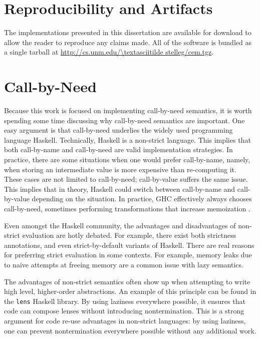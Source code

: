 \section{Reproducibility and Artifacts}

The implementations presented in this dissertation are available for download to
allow the reader to reproduce any claims made. All of the software is bundled as
a single tarball at \url{http://cs.unm.edu/\textasciitilde stelleg/cem.tgz}. 

\section{Call-by-Need}

Because this work is focused on implementing call-by-need semantics, it is worth
spending some time discussing why call-by-need semantics are important. One easy
argument is that call-by-need underlies the widely used programming language
Haskell. Technically, Haskell is a non-strict language. This implies that both
call-by-name and call-by-need are valid implementation strategies. In practice,
there are some situations when one would prefer call-by-name, namely, when
storing an intermediate value is more expensive than re-computing it. These
cases are not limited to call-by-need; call-by-value suffers the same issue.
This implies that in theory, Haskell could switch between call-by-name and
call-by-value depending on the situation. In practice, GHC effectively always
chooses call-by-need, sometimes performing transformations that increase
memoization \cite{jones96floating}.

Even amongst the Haskell community, the advantages and disadvantages of
non-strict evaluation are hotly debated. For example, there exist both
strictness annotations, and even strict-by-default variants of Haskell. There are
real reasons for preferring strict evaluation in some contexts. For example,
memory leaks due to naive attempts at freeing memory are a common issue with
lazy semantics. 

The advantages of non-strict semantics often show up when attempting to write
high level, higher-order abstractions. An example of this principle can be found
in the \texttt{lens} Haskell library. By using laziness everywhere possible, it
ensures that code can compose lenses without introducing nontermination. This is
a strong argument for code re-use advantages in non-strict languages: by using
laziness, one can prevent nontermination everywhere possible without any
additional work. 

